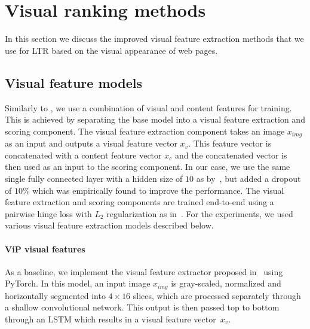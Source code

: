 
\section{Visual ranking methods}
In this section we discuss the improved visual feature extraction methods that we use for \ac{LTR} based on the visual appearance of web pages.

\subsection{Visual feature models}
Similarly to \cite{fan2017learning}, we use a combination of visual and content features for training.
This is achieved by separating the base model into a visual feature extraction and scoring component.
The visual feature extraction component takes an image $x_{img}$ as an input and outputs a visual feature vector $x_{v}$.
This feature vector is concatenated with a content feature vector $x_{c}$ and the concatenated vector is then used as an input to the scoring component.
In our case, we use the same single fully connected layer with a hidden size of $10$ as by~\citep{fan2017learning}, but added a dropout of $10\%$ which was empirically found to improve the performance. 
The visual feature extraction and scoring components are trained end-to-end using a pairwise hinge loss with $L_2$ regularization as in~\cite{fan2017learning}.
For the experiments, we used various visual feature extraction models described below.

\paragraph{ViP visual features}
As a baseline, we implement the visual feature extractor proposed in~\citet{fan2017learning} using PyTorch.
In this model, an input image $x_{img}$ is gray-scaled, normalized and horizontally segmented into $4\times16$ slices, which are processed separately through a shallow convolutional network.
This output is then passed top to bottom through an LSTM which results in a visual feature vector~$x_{v}$. 

